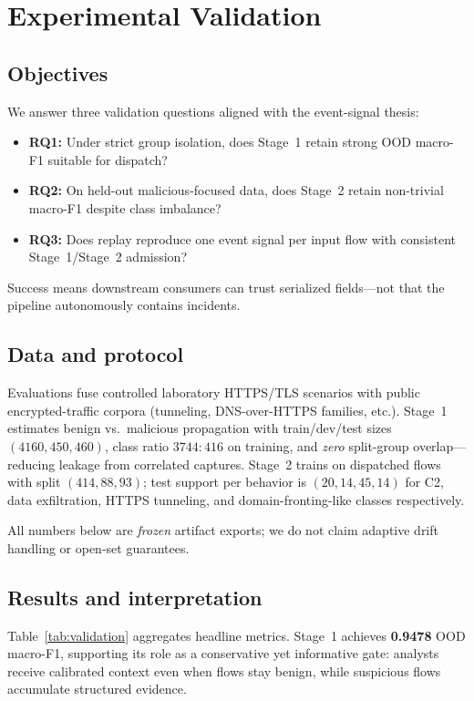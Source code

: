 \section{Experimental Validation}
\label{sec:experiments}

\subsection{Objectives}

We answer three validation questions aligned with the event-signal thesis:
\begin{itemize}\itemsep1pt
  \item \textbf{RQ1:} Under strict group isolation, does Stage~1 retain strong OOD macro-F1 suitable for dispatch?
  \item \textbf{RQ2:} On held-out malicious-focused data, does Stage~2 retain non-trivial macro-F1 despite class imbalance?
  \item \textbf{RQ3:} Does replay reproduce one event signal per input flow with consistent Stage~1/Stage~2 admission?
\end{itemize}
Success means downstream consumers can trust serialized fields---not that the pipeline autonomously contains incidents.

\subsection{Data and protocol}

Evaluations fuse controlled laboratory HTTPS/TLS scenarios with public encrypted-traffic corpora (tunneling, DNS-over-HTTPS families, etc.).
Stage~1 estimates benign vs.\ malicious propagation with train/dev/test sizes $(4160,450,460)$, class ratio $3744{:}416$ on training, and \emph{zero} split-group overlap---reducing leakage from correlated captures.
Stage~2 trains on dispatched flows with split $(414,88,93)$; test support per behavior is $(20,14,45,14)$ for C2, data exfiltration, HTTPS tunneling, and domain-fronting-like classes respectively.

All numbers below are \emph{frozen} artifact exports; we do not claim adaptive drift handling or open-set guarantees.

\subsection{Results and interpretation}

Table~\ref{tab:validation} aggregates headline metrics.
Stage~1 achieves \textbf{0.9478} OOD macro-F1, supporting its role as a conservative yet informative gate: analysts receive calibrated context even when flows stay benign, while suspicious flows accumulate structured evidence.

